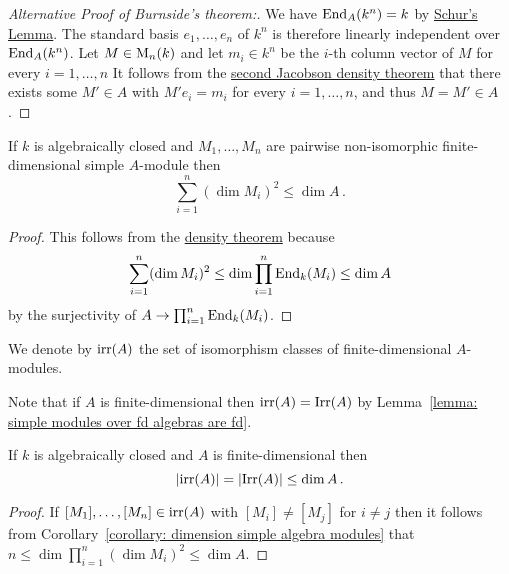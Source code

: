 \begin{proof}[Alternative Proof of Burnside’s theorem:]
  We have $\operatorname{End}_A(k^n) = k$ by \hyperref[proposition: schurs lemma for modules]{Schur’s Lemma}.
  The standard basis $e_1, \dotsc, e_n$ of $k^n$ is therefore linearly independent over $\operatorname{End}_A(k^n)$.
  Let $M \in \operatorname{M}_n(k)$ and let $m_i \in k^n$ be the $i$-th column vector of $M$ for every $i = 1, \dotsc, n$
  It follows from the \hyperref[theorem: second jacobson density theorem]{second Jacobson density theorem} that there exists some $M' \in A$ with $M' e_i = m_i$ for every $i = 1, \dotsc, n$, and thus $M = M' \in A$.
\end{proof}




\begin{corollary}
  \label{corollary: dimension simple algebra modules}
  If $k$ is algebraically closed and $M_1, \dotsc, M_n$ are pairwise non-iso\-morphic finite-dimensional simple $A$-module then
  \[
          \sum_{i=1}^n (\dim M_i)^2
    \leq  \dim A \,.
  \]
\end{corollary}


\begin{proof}
  This follows from the \hyperref[theorem: density theorem]{density theorem} because
  \[
          \sum_{i=1}^n (\dim M_i)^2
    \leq  \dim \prod_{i=1}^n \operatorname{End}_k(M_i)
    \leq  \dim A
  \]
  by the surjectivity of $A \to \prod_{i=1}^n \operatorname{End}_k(M_i)$.
\end{proof}




\begin{notation}
  We denote by $\operatorname{irr}(A)$ the set of isomorphism classes of finite-dimen\-sional $A$-modules.
\end{notation}


\begin{fluff}
  Note that if $A$ is finite-dimensional then $\operatorname{irr}(A) = \operatorname{Irr}(A)$ by Lemma~\ref{lemma: simple modules over fd algebras are fd}.
\end{fluff}


\begin{corollary}
  If $k$ is algebraically closed and $A$ is finite-dimensional then
  \[
          |{\operatorname{irr}(A)}|
    =     |{\operatorname{Irr}(A)}|
    \leq  \dim A \,.
  \]
\end{corollary}


\begin{proof}
  If $[M_1], \dotsc, [M_n] \in \operatorname{irr}(A)$ with $[M_i] \neq [M_j]$ for $i \neq j$ then it follows from Corollary~\ref{corollary: dimension simple algebra modules} that $n \leq  \dim \prod_{i=1}^n (\dim M_i)^2 \leq \dim A$.
\end{proof}




